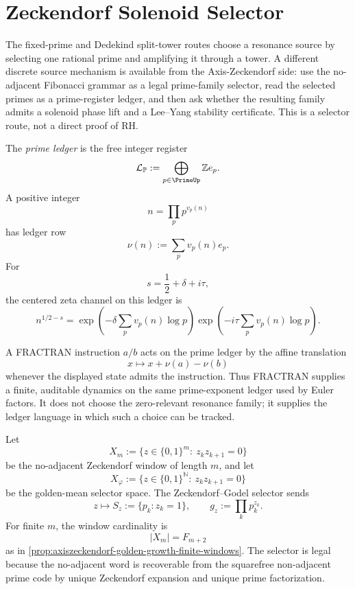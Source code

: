 \section{Zeckendorf Solenoid Selector}
\label{sec:unified-reality-zeckendorf-solenoid-selector}

The fixed-prime and Dedekind split-tower routes choose a resonance source
by selecting one rational prime and amplifying it through a tower.  A
different discrete source mechanism is available from the
Axis-Zeckendorf side: use the no-adjacent Fibonacci grammar as a legal
prime-family selector, read the selected primes as a prime-register
ledger, and then ask whether the resulting family admits a solenoid
phase lift and a Lee--Yang stability certificate.  This is a selector
route, not a direct proof of RH.

\begin{definition}
\label{def:unified-reality-prime-ledger-read}
The \emph{prime ledger} is the free integer register
$$
\mathcal L_{\mathbb P}:=\bigoplus_{p\in\PrimeUp}\mathbb Z e_p.
$$
A positive integer
$$
n=\prod_p p^{v_p(n)}
$$
has ledger row
$$
\nu(n):=\sum_p v_p(n)e_p.
$$
For
$$
s=\frac12+\delta+i\tau,
$$
the centered zeta channel on this ledger is
$$
n^{1/2-s}
=
\exp\left(-\delta\sum_p v_p(n)\log p\right)
\exp\left(-i\tau\sum_p v_p(n)\log p\right).
$$
\end{definition}

\begin{definition}
\label{def:unified-reality-fractran-ledger-transition}
A FRACTRAN instruction $a/b$ acts on the prime ledger by the affine
translation
$$
x\mapsto x+\nu(a)-\nu(b)
$$
whenever the displayed state admits the instruction.  Thus FRACTRAN
supplies a finite, auditable dynamics on the same prime-exponent ledger
used by Euler factors.  It does not choose the zero-relevant resonance
family; it supplies the ledger language in which such a choice can be
tracked.
\end{definition}

\begin{definition}
\label{def:unified-reality-zeckendorf-godel-prime-selector}
Let
$$
X_m:=\{z\in\{0,1\}^m:\ z_kz_{k+1}=0\}
$$
be the no-adjacent Zeckendorf window of length $m$, and let
$$
X_{\varphi}:=\{z\in\{0,1\}^{\mathbb N}:\ z_kz_{k+1}=0\}
$$
be the golden-mean selector space.  The Zeckendorf--Godel selector sends
$$
z\mapsto S_z:=\{p_k:z_k=1\},
\qquad
g_z:=\prod_k p_k^{z_k}.
$$
For finite $m$, the window cardinality is
$$
|X_m|=F_{m+2}
$$
as in \autoref{prop:axiszeckendorf-golden-growth-finite-windows}.  The
selector is legal because the no-adjacent word is recoverable from the
squarefree non-adjacent prime code by unique Zeckendorf expansion and
unique prime factorization.
\end{definition}

